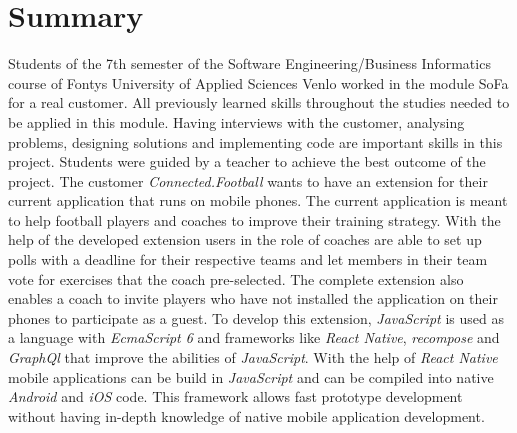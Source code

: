 \section*{Summary}

Students of the 7th semester of the Software Engineering/Business Informatics course of Fontys University of Applied Sciences Venlo worked in the module SoFa for a real customer. All previously learned skills throughout the studies needed to be applied in this module. Having interviews with the customer, analysing problems, designing solutions and implementing code are important skills in this project. Students were guided by a teacher to achieve the best outcome of the project. 
\newline
The customer \textit{Connected.Football} wants to have an extension for their current application that runs on mobile phones. The current application is meant to help football players and coaches to improve their training strategy. With the help of the developed extension users in the role of coaches are able to set up polls with a deadline for their respective teams and let members in their team vote for exercises that the coach pre-selected. The complete extension also enables a coach to invite players who have not installed the application on their phones to participate as a guest.
\newline
To develop this extension, \textit{JavaScript} is used as a language with \textit{EcmaScript 6} and frameworks like \textit{React Native}, \textit{recompose} and \textit{GraphQl} that improve the abilities of \textit{JavaScript}. With the help of \textit{React Native} mobile applications can be build in \textit{JavaScript} and can be compiled into native \textit{Android} and \textit{iOS} code. This framework allows fast prototype development without having in-depth knowledge of native mobile application development.